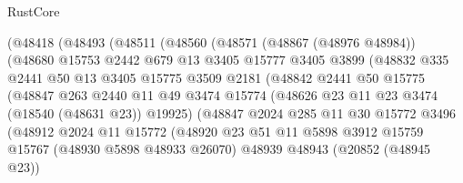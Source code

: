 \begin{lexlean}{RustCore}
\begin{coremodule}
                    (@48418
                      (@48493
                        (@48511
                          (@48560
                            (@48571
                              (@48867 (@48976 @48984))
                              (@48680
                                @15753
                                @2442
                                @679
                                @13
                                @3405
                                @15777
                                @3405
                                @3899
                                (@48832
                                  @335
                                  @2441
                                  @50
                                  @13
                                  @3405
                                  @15775
                                  @3509
                                  @2181
                                  (@48842
                                    @2441
                                    @50
                                    @15775
                                    (@48847
                                      @263
                                      @2440
                                      @11
                                      @49
                                      @3474
                                      @15774
                                      (@48626 @23 @11 @23 @3474 (@18540 (@48631 @23)) @19925)
                                      (@48847
                                        @2024
                                        @285
                                        @11
                                        @30
                                        @15772
                                        @3496
                                        (@48912
                                          @2024
                                          @11
                                          @15772
                                          (@48920
                                            @23
                                            @51
                                            @11
                                            @5898
                                            @3912
                                            @15759
                                            @15767
                                            (@48930 @5898 @48933 @26070)
                                            @48939
                                            @48943
                                            (@20852 (@48945 @23))

\end{coremodule}
\end{lexlean}
